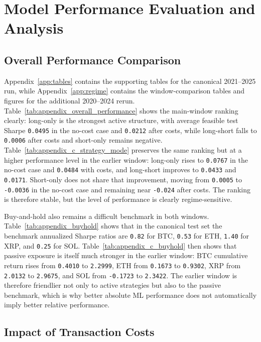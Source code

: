 \documentclass[12pt]{article}
\begin{document}
\section{Model Performance Evaluation and Analysis}

\subsection{Overall Performance Comparison}

Appendix~\ref{app:tables} contains the supporting tables for the canonical 2021--2025 run, while Appendix~\ref{app:regime} contains the window-comparison tables and figures for the additional 2020--2024 rerun. Table~\ref{tab:appendix_overall_performance} shows the main-window ranking clearly: long-only is the strongest active structure, with average feasible test Sharpe \texttt{0.0495} in the no-cost case and \texttt{0.0212} after costs, while long-short falls to \texttt{0.0006} after costs and short-only remains negative. Table~\ref{tab:appendix_c_strategy_mode} preserves the same ranking but at a higher performance level in the earlier window: long-only rises to \texttt{0.0767} in the no-cost case and \texttt{0.0484} with costs, and long-short improves to \texttt{0.0433} and \texttt{0.0171}. Short-only does not share that improvement, moving from \texttt{0.0005} to \texttt{-0.0036} in the no-cost case and remaining near \texttt{-0.024} after costs. The ranking is therefore stable, but the level of performance is clearly regime-sensitive.

Buy-and-hold also remains a difficult benchmark in both windows. Table~\ref{tab:appendix_buyhold} shows that in the canonical test set the benchmark annualized Sharpe ratios are \texttt{0.82} for BTC, \texttt{0.53} for ETH, \texttt{1.40} for XRP, and \texttt{0.25} for SOL. Table~\ref{tab:appendix_c_buyhold} then shows that passive exposure is itself much stronger in the earlier window: BTC cumulative return rises from \texttt{0.4010} to \texttt{2.2999}, ETH from \texttt{0.1673} to \texttt{0.9302}, XRP from \texttt{2.0132} to \texttt{2.9675}, and SOL from \texttt{-0.1723} to \texttt{2.3422}. The earlier window is therefore friendlier not only to active strategies but also to the passive benchmark, which is why better absolute ML performance does not automatically imply better relative performance.

\subsection{Impact of Transaction Costs}
\end{document}
